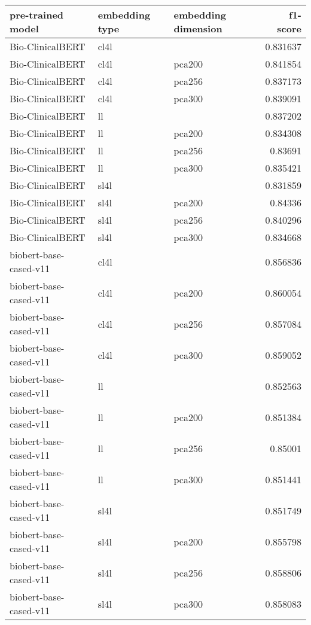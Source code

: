 \begin{tabular}{lllr}
\hline
 pre-trained model      & embedding type   & embedding dimension   &   f1-score \\
\hline
 Bio-ClinicalBERT       & cl4l             &                       &   0.831637 \\
 Bio-ClinicalBERT       & cl4l             & pca200                &   0.841854 \\
 Bio-ClinicalBERT       & cl4l             & pca256                &   0.837173 \\
 Bio-ClinicalBERT       & cl4l             & pca300                &   0.839091 \\
 Bio-ClinicalBERT       & ll               &                       &   0.837202 \\
 Bio-ClinicalBERT       & ll               & pca200                &   0.834308 \\
 Bio-ClinicalBERT       & ll               & pca256                &   0.83691  \\
 Bio-ClinicalBERT       & ll               & pca300                &   0.835421 \\
 Bio-ClinicalBERT       & sl4l             &                       &   0.831859 \\
 Bio-ClinicalBERT       & sl4l             & pca200                &   0.84336  \\
 Bio-ClinicalBERT       & sl4l             & pca256                &   0.840296 \\
 Bio-ClinicalBERT       & sl4l             & pca300                &   0.834668 \\
 biobert-base-cased-v11 & cl4l             &                       &   0.856836 \\
 biobert-base-cased-v11 & cl4l             & pca200                &   0.860054 \\
 biobert-base-cased-v11 & cl4l             & pca256                &   0.857084 \\
 biobert-base-cased-v11 & cl4l             & pca300                &   0.859052 \\
 biobert-base-cased-v11 & ll               &                       &   0.852563 \\
 biobert-base-cased-v11 & ll               & pca200                &   0.851384 \\
 biobert-base-cased-v11 & ll               & pca256                &   0.85001  \\
 biobert-base-cased-v11 & ll               & pca300                &   0.851441 \\
 biobert-base-cased-v11 & sl4l             &                       &   0.851749 \\
 biobert-base-cased-v11 & sl4l             & pca200                &   0.855798 \\
 biobert-base-cased-v11 & sl4l             & pca256                &   0.858806 \\
 biobert-base-cased-v11 & sl4l             & pca300                &   0.858083 \\
\hline
\end{tabular}